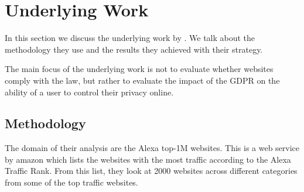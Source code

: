 \section{Underlying Work}
\label{sec:underlying}

In this section we discuss the underlying work by . We talk about the methodology they use and the
results they achieved with their strategy.

The main focus of the underlying work is not to evaluate whether websites comply with the law, but rather to evaluate
the impact of the GDPR on the ability of a user to control their privacy online.

\subsection{Methodology}
\label{subsec:methodology}

The domain of their analysis are the Alexa top-1M websites. This is a web service by amazon which lists the websites with
the most traffic according to the Alexa Traffic Rank. From this list, they look at 2000 websites across different
categories from some of the top traffic websites.

